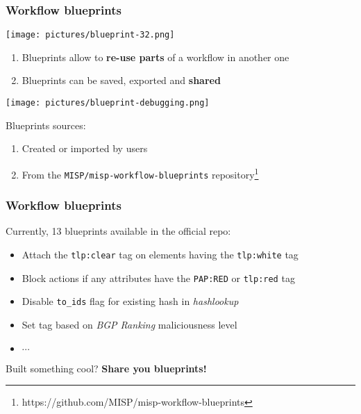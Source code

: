 \begin{frame}
    \frametitle{Workflow blueprints}
    \hspace*{0.9\textwidth}\texttt{[image: pictures/blueprint-32.png]}
    \vspace*{-2em}
    \begin{enumerate}
        \item Blueprints allow to \textbf{re-use parts} of a workflow in another one
        \item Blueprints can be saved, exported and \textbf{shared}
    \end{enumerate}
    \begin{center}
        \texttt{[image: pictures/blueprint-debugging.png]}
    \end{center}
    Blueprints sources:
    \begin{enumerate}
        \item Created or imported by users
        \item From the \texttt{MISP/misp-workflow-blueprints} repository\footnote{\scriptsize https://github.com/MISP/misp-workflow-blueprints}
    \end{enumerate}
\end{frame}

\begin{frame}
    \frametitle{Workflow blueprints}
    Currently, 13 blueprints available in the official repo:
    \vspace*{1em}
    \begin{itemize}
        \item Attach the \texttt{tlp:clear} tag on elements having the \texttt{tlp:white} tag
        \item Block actions if any attributes have the \texttt{PAP:RED} or \texttt{tlp:red} tag
        \item Disable \texttt{to\_ids} flag for existing hash in \textit{hashlookup}
        \item Set tag based on \textit{BGP Ranking} maliciousness level
        \item $\cdots$
    \end{itemize}
    \vspace*{1em}
    Built something cool? \textbf{Share you blueprints!}
\end{frame}

